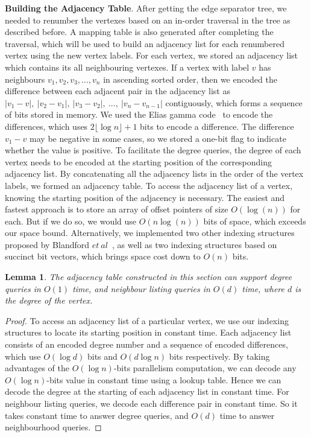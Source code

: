 \documentclass[12pt,glossary]{dalthesis}
\newtheorem{lemma}[theorem]{Lemma}
\begin{document}
\textbf{Building the Adjacency Table}. After getting the edge separator tree, we needed to renumber the vertexes based on an in-order traversal in the tree as described before. A mapping table is also generated after completing the traversal, which will be used to build an adjacency list for each renumbered vertex using the new vertex labels. For each vertex, we stored an adjacency list which contains its all neighbouring vertexes. If a vertex with label $v$ has neighbours $v_{1}, v_{2}, v_{3}, ...,v_{n}$ in ascending sorted order, then we encoded the difference between each adjacent pair in the adjacency list as $|v_{1}-v|, \ |v_{2}-v_{1}|,\  |v_{3}-v_{2}|,\ ...,\ |v_{n}-v_{n-1}|$ contiguously, which forms a sequence of bits stored in memory. We used the Elias gamma code~\cite{Gamma} to encode the differences, which uses $2\lfloor \log n \rfloor + 1$ bits to encode a difference. The difference $v_{1} - v$ may be negative in some cases, so we stored a one-bit flag to indicate whether the value is positive. To facilitate the degree queries, the degree of each vertex needs to be encoded at the starting position of the corresponding adjacency list. By concatenating all the adjacency lists in the order of the vertex labels, we formed an adjacency table. To access the adjacency list of a vertex, knowing the starting position of the adjacency is necessary. The easiest and fastest approach is to store an array of offset pointers of size $O(\log (n))$ for each. But if we do so, we would use $O(n\log (n))$ bits of space, which exceeds our space bound. Alternatively, we implemented two other indexing structures proposed by Blandford $et \ al$~\cite{compact-representation}, as well as two indexing structures based on succinct bit vectors, which brings space cost down to $O(n)$ bits.

\bigskip
\begin{lemma}
The adjacency table constructed in this section can support degree queries in $O(1)$ time, and neighbour listing queries in $O(d)$ time, where $d$ is the degree of the vertex.
\end{lemma}
\bigskip 
\begin{proof}
To access an adjacency list of a particular vertex, we use our indexing structures to locate its starting position in constant time. Each adjacency list consists of an encoded degree number and a sequence of encoded differences, which use $O(\log d)$ bits and $O(d\log n)$ bits respectively. By taking advantages of the $O(\log n)$-bits parallelism computation, we can decode any $O(\log n)$-bits value in constant time using a lookup table. Hence we can decode the degree at the starting of each adjacency list in constant time. For neighbour listing queries, we decode each difference pair in constant time. So it takes constant time to answer degree queries, and $O(d)$ time to answer neighbourhood queries.
\end{proof}
\end{document}
